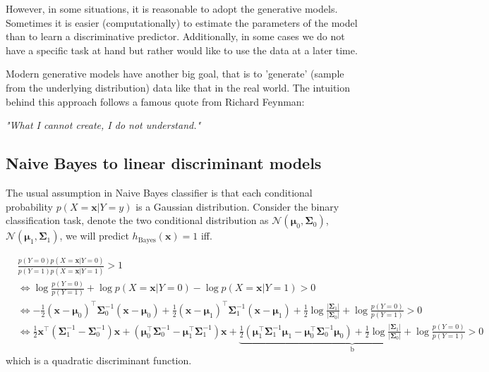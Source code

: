\documentclass{article}
\begin{document}
	However, in some situations, it is reasonable to adopt the generative models. Sometimes it is easier (computationally) to estimate the parameters of the model than to learn a discriminative predictor. Additionally, in some cases we do not have a specific task at hand but rather would like to use the data at a later time.
	
	Modern generative models have another big goal, that is to 'generate' (sample from the underlying distribution) data like that in the real world. The intuition behind this approach follows a famous quote from Richard Feynman:	
	\begin{center}
	\textit{"What I cannot create, I do not understand."}
	\end{center}

	\subsection{Naive Bayes to linear discriminant models}
	The usual assumption in Naive Bayes classifier is that each conditional probability $p(X=\bm{x}|Y=y)$ is a Gaussian distribution. Consider the binary classification task, denote the two conditional distribution as $\mathcal{N}(\bm{\mu}_0,\bm{\Sigma}_0)$, $\mathcal{N}(\bm{\mu}_1,\bm{\Sigma}_1)$, we will predict $h_{\mathrm{Bayes}}(\bm{x})=1$ iff.
	
	\begin{equation*}
	\begin{split}
	&\frac{p(Y=0) p(X=\bm{x}|Y=0)}{p(Y=1) p(X=\bm{x}|Y=1)} > 1 \\
	&\iff \log \frac{p(Y=0)}{p(Y=1)} + \log p(X=\bm{x}|Y=0) - \log p(X=\bm{x}|Y=1) > 0 \\
	&\iff -\frac{1}{2}(\bm{x}-\bm{\mu}_0)^\top \bm{\Sigma}_0^{-1}(\bm{x}-\bm{\mu}_0) + \frac{1}{2}(\bm{x}-\bm{\mu}_1)^\top \bm{\Sigma}_1^{-1}(\bm{x}-\bm{\mu}_1) +  \frac{1}{2}\log\frac{|\bm{\Sigma}_1|}{|\bm{\Sigma}_0|} + \log \frac{p(Y=0)}{p(Y=1)} > 0 \\
	&\iff \frac{1}{2} \bm{x}^\top ( \bm{\Sigma}_1^{-1} - \bm{\Sigma}_0^{-1}) \bm{x} + (\bm{\mu}_0^\top\bm{\Sigma}_0^{-1} - \bm{\mu}_1^\top\bm{\Sigma}_1^{-1}) \bm{x} + \underbrace{\frac{1}{2} (\bm{\mu}_1^\top\bm{\Sigma}_1^{-1}\bm{\mu}_1 - \bm{\mu}_0^\top\bm{\Sigma}_0^{-1}\bm{\mu}_0 ) + \frac{1}{2}\log\frac{|\bm{\Sigma}_1|}{|\bm{\Sigma}_0|} + \log \frac{p(Y=0)}{p(Y=1)}}_{\mathrm{b}} > 0
	\end{split}
	\end{equation*}
which is a quadratic discriminant function.
\end{document}
